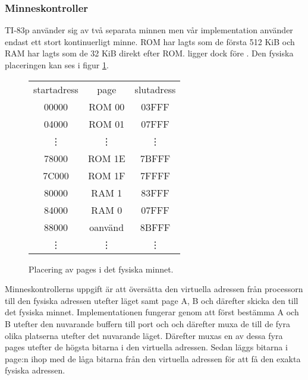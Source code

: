 \documentclass[main.tex]{subfiles}
\begin{document}
\subsubsection{Minneskontroller}
\label{sec:mmap}
TI-83p använder sig av två separata minnen men vår implementation använder
endast ett stort kontinuerligt minne. ROM har lagts som de första 512 KiB och
RAM har lagts som de 32 KiB direkt efter ROM.  ligger dock före
. Den fysiska placeringen kan ses i figur \ref{fig:physical}.

\begin{figure}[H]
    \center
    \small\ttfamily\arraybackslash
    \begin{tabular}{c|c|c}
        \multicolumn{1}{c}{\normalfont startadress} &
        \multicolumn{1}{c}{\normalfont page} &
        \multicolumn{1}{c}{\normalfont slutadress} \\ \cline{2-2}
        00000  & ROM 00  & 03FFF \\ \cline{2-2}
        04000  & ROM 01  & 07FFF \\
        \multicolumn{1}{c}{\vdots} &
        \multicolumn{1}{c}{\vdots} & \vdots \\
        78000  & ROM 1E  & 7BFFF \\ \cline{2-2}
        7C000  & ROM 1F  & 7FFFF \\ \cline{2-2}
        80000  & RAM 1   & 83FFF \\ \cline{2-2}
        84000  & RAM 0   & 07FFF \\ \cline{2-2}
        88000  & oanvänd & 8BFFF \\ \cline{2-2}
        \vdots & \vdots  & \vdots \\
    \end{tabular}
    \caption{Placering av pages i det fysiska minnet.}
    \label{fig:physical}
\end{figure}

Minneskontrollerns uppgift är att översätta den virtuella adressen från
processorn till den fysiska adressen utefter läget samt page A, B och därefter
skicka den till det fysiska minnet. Implementationen fungerar genom att först
bestämma A och B utefter den nuvarande buffern till port  och
 och därefter muxa de till de fyra olika platserna utefter det
nuvarande läget. Därefter muxas en av dessa fyra pages utefter de högsta
bitarna i den virtuella adressen. Sedan läggs bitarna i page:n ihop med de låga
bitarna från den virtuella adressen för att få den exakta fysiska adressen.
\end{document}
